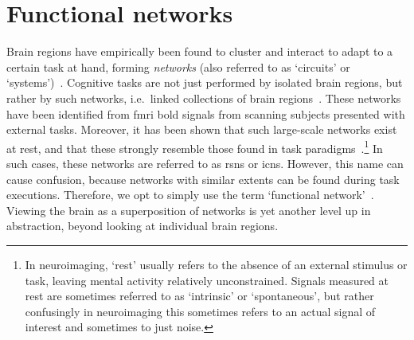 \clearpage
\section{Functional networks}\label{sec:functional-brain-networks}

Brain regions have empirically been found to cluster and interact to adapt to a certain task at hand, forming \emph{networks} (also referred to as `circuits' or `systems')~\parencite{Fox2007}.
Cognitive tasks are not just performed by isolated brain regions, but rather by such networks, i.e.~linked collections of brain regions~\parencite{Bressler2010}.
%
These networks have been identified from \gls{fmri} \gls{bold} signals from scanning subjects presented with external tasks.
Moreover, it has been shown that such large-scale networks exist at rest, and that these strongly resemble those found in task paradigms~\parencite{Smith2009}.\footnote{In neuroimaging, `rest' usually refers to the absence of an external stimulus or task, leaving mental activity relatively unconstrained. Signals measured at rest are sometimes referred to as `intrinsic' or `spontaneous', but rather confusingly in neuroimaging this sometimes refers to an actual signal of interest and sometimes to just noise.}
In such cases, these networks are referred to as \glspl{rsn} or \glspl{icn}.
However, this name can cause confusion, because networks with similar extents can be found during task executions.
Therefore, we opt to simply use the term `functional network'~\parencite[FN; see also][]{Finn2021}.
Viewing the brain as a superposition of networks is yet another level up in abstraction, beyond looking at individual brain regions.

